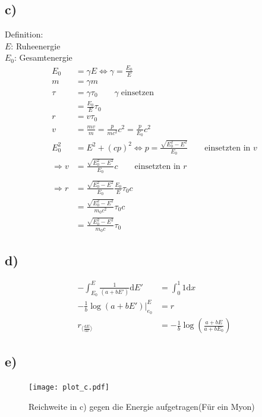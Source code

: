 \subsection{c)}
    Definition:\\
    $E$: Ruheenergie\\
    $E_0$: Gesamtenergie
    \begin{align}
        E_0 &= \gamma E \Leftrightarrow \gamma = \frac{E_0}{E}\\
        m &= \gamma m\\
        \tau &= \gamma \tau_0 \qquad \gamma\; \text{einsetzen}\\
        &= \frac{E_0}{E} \tau_0\\
        r &= v\tau_0\\
        v &= \frac{mv}{m} = \frac{p}{mc^2}c^2 = \frac{p}{E_0}c^2\\
        E_0^2 &= E^2 + (cp)^2 \Leftrightarrow p = \frac{\sqrt{E_0^2-E^2}}{E_0} \qquad \text{einsetzten in $v$}\\
        \Rightarrow v &= \frac{\sqrt{E_0^2-E^2}}{E_0}c \qquad \text{einsetzten in $r$}\\
        \\
        \Rightarrow r &= \frac{\sqrt{E_0^2-E^2}}{E_0} \frac{E_0}{E} \tau_0 c\\
        &= \frac{\sqrt{E_0^2-E^2}}{m_0 c^2} \tau_0 c\\
        &= \frac{\sqrt{E_0^2-E^2}}{m_0 c} \tau_0
    \end{align}

\subsection{d)}

    \begin{align}
        -\int_{E_0}^{E} \frac{1}{(a+bE')} \mathrm{d}E' &= \int_{0}^{1} 1 \mathrm{d}x\\
        -\frac{1}{b}\log(a+bE')\vert_{e_0}^{E} &= r\\
        r_{\langle \frac{\mathrm{d}E}{\mathrm{d}x} \rangle} &= -\frac{1}{b}\log\left(\frac{a+bE}{a+bE_0}\right)
    \end{align}

\subsection{e)}


\begin{figure}[H]
    \centering
    \texttt{[image: plot\_c.pdf]}
    \caption{Reichweite in c) gegen die Energie aufgetragen(Für ein Myon)}
\end{figure}


